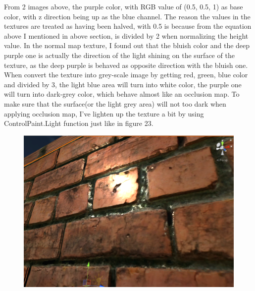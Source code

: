 \documentclass[a4paper, 13pt]{extarticle}
\begin{document}
{\begin{figure}[h]
{\begin{minipage}{.4\textwidth}
			\centering
			\label{fig:test23}
		\end{minipage}
	}
\end{figure}
\vspace{5.5cm}
From 2 images above, the purple color, with RGB value of (0.5, 0.5, 1) as base color, with z direction being up as the blue channel. The reason the values in the textures are treated as having been halved, with 0.5 is because from the equation above I mentioned in above section, is divided by 2 when normalizing the height value. In the normal map texture, I found out that the bluish color and the deep purple one is actually the direction of the light shining on the surface of the texture, as the deep purple is behaved as opposite direction with the bluish one. When convert the texture into grey-scale image by getting red, green, blue color and divided by 3, the light blue area will turn into white color, the purple one will turn into dark-grey color, which behave almost like an occlusion map. To make sure that the surface(or the light grey area) will not too dark when applying occlusion map, I've lighten up the texture a bit by using ControlPaint.Light function just like in figure 23. 
\begin{figure}[h]
	\begin{minipage}{.4\textwidth}
		\centering
		\includegraphics[width=1\linewidth]{intructions/without_occlusion.png}
		\centering
		\label{fig:test24}
	\end{minipage}
	\begin{minipage}{.45\textwidth}
		\centering

\end{minipage}
\end{figure}}
\end{document}
